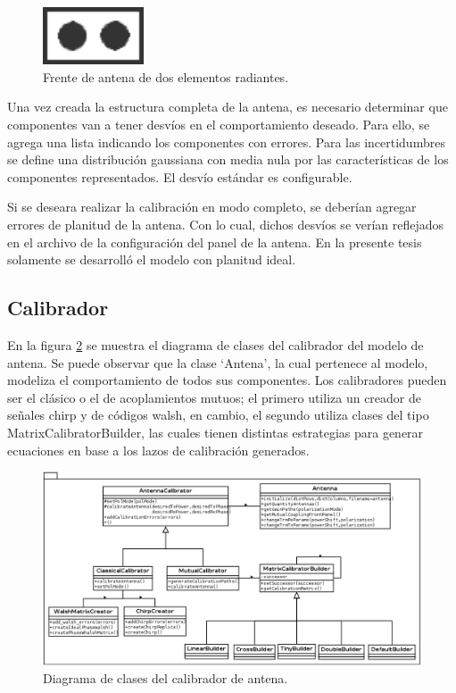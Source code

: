\begin{figure}
 \centering
 \includegraphics[width=3cm]{gfx/FrontAntenna2.png}
 \caption{Frente de antena de dos elementos radiantes.}
 \label{fig:frontAntenna}
\end{figure}

Una vez creada la estructura completa de la antena, es necesario determinar que componentes van a tener desvíos en el
comportamiento deseado. Para ello, se agrega una lista indicando los componentes con errores. Para las incertidumbres se define
una distribución gaussiana con media nula por las características de los componentes representados. El desvío estándar es 
configurable.

Si se deseara realizar la calibración en modo completo, se deberían agregar errores de planitud de la antena. Con lo cual, 
dichos desvíos se verían reflejados en el archivo de la configuración del panel de la antena. En la presente tesis solamente 
se desarrolló el modelo con planitud ideal.


\subsection{Calibrador}

En la figura \ref{fig:modelPackage} se muestra el diagrama de clases del calibrador del modelo de antena. Se puede observar que
la clase \enquote*{Antena}, la cual pertenece al modelo, modeliza el comportamiento de todos sus componentes. Los calibradores
pueden ser el clásico o el de acoplamientos mutuos; el primero utiliza un creador de señales chirp y de códigos walsh, en
cambio, el segundo utiliza clases del tipo MatrixCalibratorBuilder, las cuales tienen distintas estrategias para generar
ecuaciones en base a los lazos de calibración generados.

\begin{figure}
 \centering
 \includegraphics[width=15cm]{gfx/modelPackage.png}
 \caption{Diagrama de clases del calibrador de antena.}
 \label{fig:modelPackage}
\end{figure}


